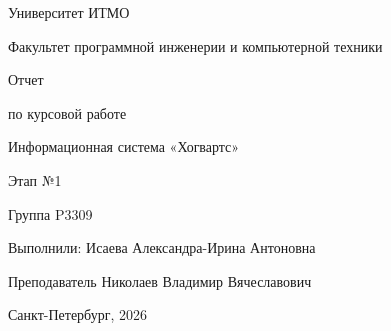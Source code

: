 \begin{titlepage}

\thispagestyle{empty}

\centerline{Университет ИТМО}
\centerline{Факультет программной инженерии и компьютерной техники}


\vfill

\centerline{\huge{Отчет}}
\centerline{\large{по курсовой работе}}
\centerline{\LARGE{Информационная система «Хогвартс»}}
\centerline{\large{Этап №1}}

\vfill

Группа  \hfill P3309

Выполнили: \hfill Исаева Александра-Ирина Антоновна\hfill


Преподаватель \hfill  Николаев Владимир Вячеславович

\vfill

\centerline{Санкт-Петербург, 2026}
\clearpage
\end{titlepage}